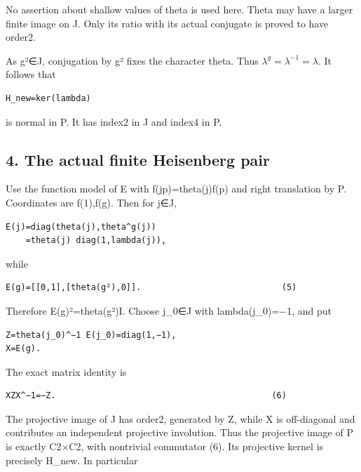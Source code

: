 No assertion about shallow values of theta is used here. Theta may have
a larger finite image on J. Only its ratio with its actual conjugate is
proved to have order2.

As g²∈J, conjugation by g² fixes the character theta. Thus
\(\lambda^g=\lambda^{-1}=\lambda\). It follows that

\begin{Verbatim}[fontsize=\small,breaklines=true,breakanywhere=true]
H_new=ker(lambda)
\end{Verbatim}

is normal in P. It has index2 in J and index4 in P.

\hypertarget{rank~2-the-actual-finite-heisenberg-pair}{%
\subsection{4. The actual finite Heisenberg
pair}\label{rank~2-the-actual-finite-heisenberg-pair}}

Use the function model of E with f(jp)=theta(j)f(p) and right
translation by P. Coordinates are f(1),f(g). Then for j∈J,

\begin{Verbatim}[fontsize=\small,breaklines=true,breakanywhere=true]
E(j)=diag(theta(j),theta^g(j))
    =theta(j) diag(1,lambda(j)),
\end{Verbatim}

while

\begin{Verbatim}[fontsize=\small,breaklines=true,breakanywhere=true]
E(g)=[[0,1],[theta(g²),0]].                            (5)
\end{Verbatim}

Therefore E(g)²=theta(g²)I. Choose j\_0∈J with lambda(j\_0)=−1, and put

\begin{Verbatim}[fontsize=\small,breaklines=true,breakanywhere=true]
Z=theta(j_0)^−1 E(j_0)=diag(1,−1),
X=E(g).
\end{Verbatim}

The exact matrix identity is

\begin{Verbatim}[fontsize=\small,breaklines=true,breakanywhere=true]
XZX^−1=−Z.                                           (6)
\end{Verbatim}

The projective image of J has order2, generated by Z, while X is
off-diagonal and contributes an independent projective involution. Thus
the projective image of P is exactly C2×C2, with nontrivial commutator
(6). Its projective kernel is precisely H\_new. In particular

